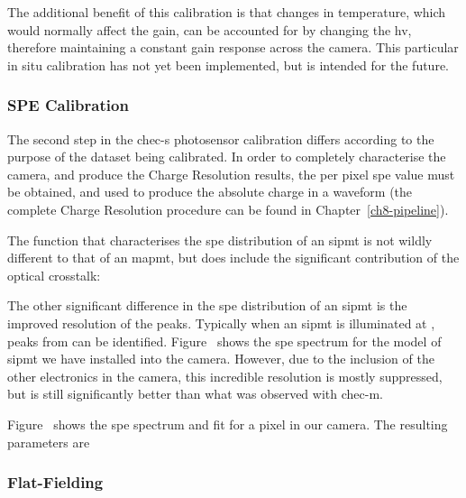 
The additional benefit of this calibration is that changes in temperature, which would normally affect the gain, can be accounted for by changing the \gls{hv}, therefore maintaining a constant gain response across the camera. This particular in situ calibration has not yet been implemented, but is intended for the future.


\subsubsection{SPE Calibration}

The second step in the \gls{chec-s} photosensor calibration differs according to the purpose of the dataset being calibrated. In order to completely characterise the camera, and produce the Charge Resolution results, the per pixel \gls{spe} value must be obtained, and used to produce the absolute charge in a waveform (the complete Charge Resolution procedure can be found in Chapter~\ref{ch8-pipeline}).

The function that characterises the \gls{spe} distribution of an \gls{sipmt} is not wildly different to that of an \gls{mapmt}, but does include the significant contribution of the optical crosstalk:

The other significant difference in the \gls{spe} distribution of an \gls{sipmt} is the improved resolution of the peaks. Typically when an \gls{sipmt} is illuminated at , peaks from  can be identified. Figure~ shows the \gls{spe} spectrum for the model of \gls{sipmt} we have installed into the camera. However, due to the inclusion of the other electronics in the camera, this incredible resolution is mostly suppressed, but is still significantly better than what was observed with \gls{chec-m}.

Figure~ shows the \gls{spe} spectrum and fit for a pixel in our camera. The resulting parameters are 

\subsubsection{Flat-Fielding}

